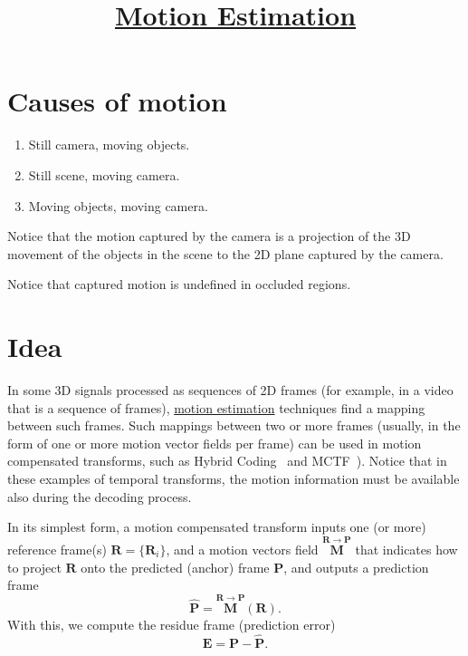 

\title{\href{https://vicente-gonzalez-ruiz.github.io/motion_estimation}{Motion Estimation}}

\maketitle

\section{Causes of motion}
\begin{enumerate}
\item Still camera, moving objects.
\item Still scene, moving camera.
\item Moving objects, moving camera.
\end{enumerate}

Notice that the motion captured by the camera is a projection of the
3D movement of the objects in the scene to the 2D plane captured by
the camera.

Notice that captured motion is undefined in occluded regions.

\section{Idea}

In some 3D signals processed as sequences of 2D frames (for example,
in a video that is a sequence of frames),
\href{https://en.wikipedia.org/wiki/Motion_estimation}{motion
  estimation} techniques find a mapping between such frames. Such
mappings between two or more frames (usually, in the form of one or
more motion vector fields per frame) can be used in motion compensated
transforms, such as Hybrid Coding~\cite{vruiz__hybrid_coding} and
MCTF~\cite{vruiz__MCTF}). Notice that in these examples of temporal
transforms, the motion information must be available also during the
decoding process.

In its simplest form, a motion compensated transform inputs one (or
more) reference frame(s) ${\mathbf R}=\{{\mathbf R}_i\}$, and a motion
vectors field $\overset{{\mathbf R}\rightarrow{\mathbf P}}{\mathbf M}$
that indicates how to project ${\mathbf R}$ onto the predicted
(anchor) frame ${\mathbf P}$, and outputs a prediction frame
\begin{equation}
  \hat{{\mathbf P}} =  \overset{{\mathbf R}\rightarrow {\mathbf P}}{\mathbf M}({\mathbf R}).
  \label{eq:MCP1}
\end{equation}
With this, we compute the residue frame (prediction error)
\begin{equation}
  {\mathbf E} = {\mathbf P} - \hat{\mathbf P}.
\end{equation}

